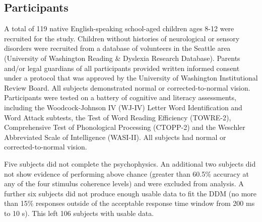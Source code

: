 \documentclass[../uwthesis.tex]{subfiles}
\begin{document}
\subsection{Participants}
A total of 119 native English-speaking school-aged children ages 8-12 were recruited for the study. Children without histories of neurological or sensory disorders were recruited from a database of volunteers in the Seattle area (University of Washington Reading \& Dyslexia Research Database). Parents and/or legal guardians of all participants provided written informed consent under a protocol that was approved by the University of Washington Institutional Review Board. All subjects demonstrated normal or corrected-to-normal vision. Participants were tested on a battery of cognitive and literacy assessments, including the Woodcock-Johnson IV (WJ-IV) Letter Word Identification and Word Attack subtests, the Test of Word Reading Efficiency (TOWRE-2), Comprehensive Test of Phonological Processing (CTOPP-2) and the Weschler Abbreviated Scale of Intelligence (WASI-II). All subjects had normal or corrected-to-normal vision.

Five subjects did not complete the psychophysics. An additional two subjects did not show evidence of performing above chance (greater than 60.5\% accuracy at any of the four stimulus coherence levels) and were excluded from analysis. A further six subjects did not produce enough usable data to fit the DDM (no more than 15\% responses outside of the acceptable response time window from 200 ms to 10 s). This left 106 subjects with usable data.
\end{document}

